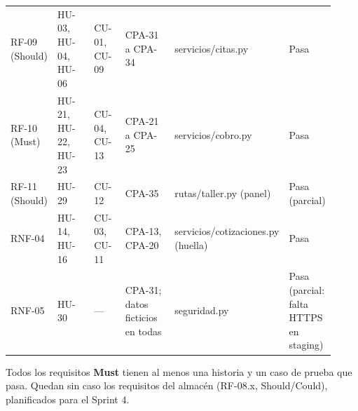{\begin{longtable}{@{}L{0.09\linewidth}L{0.17\linewidth}L{0.12\linewidth}L{0.2\linewidth}L{0.24\linewidth}L{0.1\linewidth}@{}}
RF-09 (Should) & HU-03, HU-04, HU-06 & CU-01, CU-09 & CPA-31 a CPA-34 & servicios/citas.py & Pasa \\
RF-10 (Must) & HU-21, HU-22, HU-23 & CU-04, CU-13 & CPA-21 a CPA-25 & servicios/cobro.py & Pasa \\
RF-11 (Should) & HU-29 & CU-12 & CPA-35 & rutas/taller.py (panel) & Pasa (parcial) \\
RNF-04 & HU-14, HU-16 & CU-03, CU-11 & CPA-13, CPA-20 & servicios/cotizaciones.py (huella) & Pasa \\
RNF-05 & HU-30 & --- & CPA-31; datos ficticios en todas & seguridad.py & Pasa (parcial: falta HTTPS en staging) \\
\end{longtable}
}

Todos los requisitos \textbf{Must} tienen al menos una historia y un caso de prueba que pasa. Quedan sin
caso los requisitos del almacén (RF-08.x, Should/Could), planificados para el Sprint 4.
